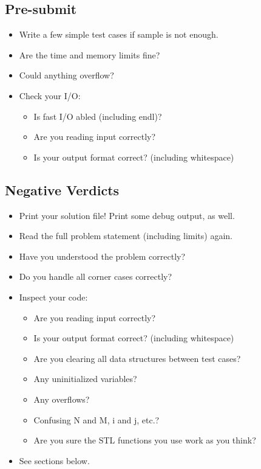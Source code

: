 \subsection{Pre-submit}
\begin{itemize}
	\item Write a few simple test cases if sample is not enough.
	\item Are the time and memory limits fine?
	\item Could anything overflow?
	\item Check your I/O:
	\begin{itemize}
		\item Is fast I/O abled (including endl)?
		\item Are you reading input correctly?
		\item Is your output format correct? (including whitespace)
	\end{itemize}
\end{itemize}

\subsection{Negative Verdicts}
\begin{itemize}
	\item Print your solution file! Print some debug output, as well.
	\item Read the full problem statement (including limits) again.
	\item Have you understood the problem correctly?
	\item Do you handle all corner cases correctly?
	\item Inspect your code:
	\begin{itemize}
		\item Are you reading input correctly?
		\item Is your output format correct? (including whitespace)
		\item Are you clearing all data structures between test cases?
		\item Any uninitialized variables?
		\item Any overflows?
		\item Confusing N and M, i and j, etc.?
		\item Are you sure the STL functions you use work as you think?
	\end{itemize}
	\item See sections below.
\end{itemize}

